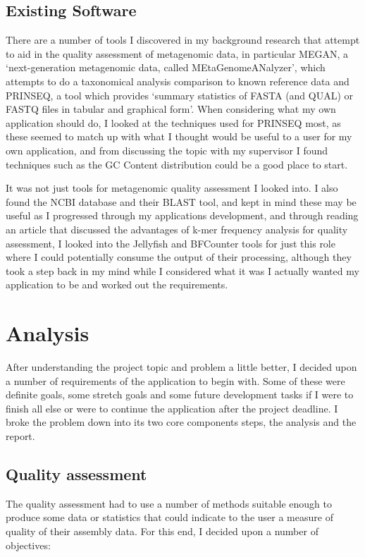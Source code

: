 \subsection{Existing Software}
There are a number of tools I discovered in my background research that attempt to aid in the quality assessment of metagenomic data, in particular MEGAN, a `next-generation metagenomic data, called MEtaGenomeANalyzer', which attempts to do a taxonomical analysis comparison to known reference data\cite{citeulike:10457549} and PRINSEQ, a tool which provides `summary statistics of FASTA (and QUAL) or FASTQ files in tabular and graphical form'\cite{citeulike:8714996}. When considering what my own application should do, I looked at the techniques used for PRINSEQ most, as these seemed to match up with what I thought would be useful to a user for my own application, and from discussing the topic with my supervisor I found techniques such as the GC Content distribution could be a good place to start.

It was not just tools for metagenomic quality assessment I looked into. I also found the NCBI database and their BLAST tool\cite{citeulike:11826724}, and kept in mind these may be useful as I progressed through my applications development, and through reading an article that discussed the advantages of k-mer frequency analysis for quality assessment, I looked into the Jellyfish\cite{citeulike:8643499} and BFCounter\cite{citeulike:9639487} tools for just this role where I could potentially consume the output of their processing, although they took a step back in my mind while I considered what it was I actually wanted my application to be and worked out the requirements.


\section{Analysis}
After understanding the project topic and problem a little better, I decided upon a number of requirements of the application to begin with. Some of these were definite goals, some stretch goals and some future development tasks if I were to finish all else or were to continue the application after the project deadline. I broke the problem down into its two core components steps, the analysis and the report. 

\subsection{Quality assessment}
The quality assessment had to use a number of methods suitable enough to produce some data or statistics that could indicate to the user a measure of quality of their assembly data. For this end, I decided upon a number of objectives:

